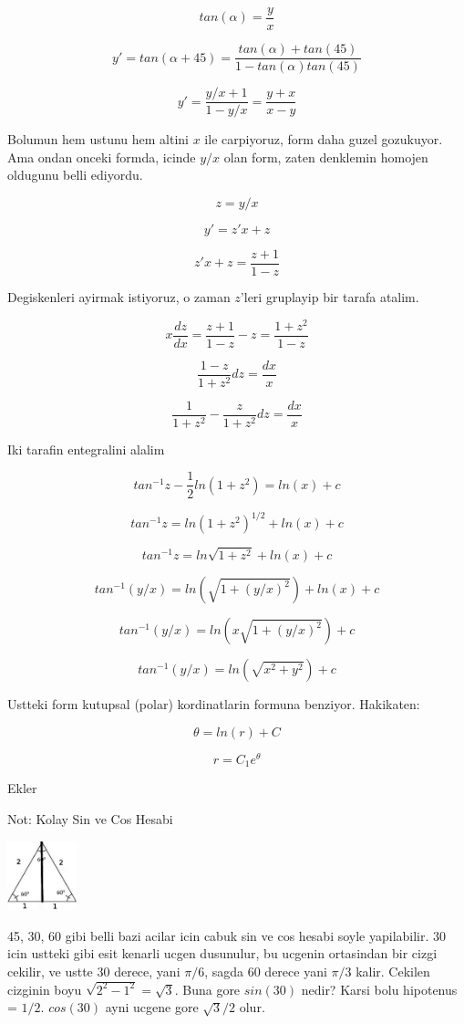 \documentclass[12pt,fleqn]{article}\usepackage{../common}
\begin{document}
\[ tan (\alpha) = \frac{y}{x} \]

\[ y' = tan(\alpha + 45) = \frac{tan(\alpha) + tan(45)}{1 - tan(\alpha)tan(45)} \]

\[ y' = \frac{y/x + 1}{1-y/x} =  \frac{y+x}{x-y} \]

Bolumun hem ustunu hem altini $x$ ile carpiyoruz, form daha guzel
gozukuyor. Ama ondan onceki formda, icinde $y/x$ olan form, zaten
denklemin homojen oldugunu belli ediyordu. 

\[ z = y/x \]

\[ y' = z'x + z \]

\[ z'x +z = \frac{z+1}{1-z} \]

Degiskenleri ayirmak istiyoruz, o zaman $z$'leri gruplayip bir tarafa
atalim. 

\[ x \frac{dz}{dx} = \frac{z+1}{1-z} - z = \frac{1+z^2}{1-z} \]

\[ \frac{1-z}{1+z^2}dz = \frac{dx}{x} \]

\[ \frac{1}{1+z^2} - \frac{z}{1+z^2} dz = \frac{dx}{x} \]


Iki tarafin entegralini alalim

\[ tan^{-1}z - \frac{1}{2} ln (1+z^2) = ln(x) + c \]

\[ tan^{-1}z = ln (1+z^2)^{1/2} + ln(x) + c \]

\[ tan^{-1}z = ln \sqrt{1+z^2} + ln(x) + c \]

\[ tan^{-1}(y/x) = ln (\sqrt{1+(y/x)^2}) + ln(x) + c \]

\[ tan^{-1}(y/x) = ln(x \sqrt{1+(y/x)^2}) + c \]

\[ tan^{-1}(y/x) = ln(\sqrt{x^2+y^2}) + c \]

Ustteki form kutupsal (polar) kordinatlarin formuna benziyor. Hakikaten:

\[ \theta = ln(r) + C \]

\[ r = C_1e^{\theta} \]

Ekler

Not: Kolay Sin ve Cos Hesabi

\includegraphics[height=2cm]{4_3.png}

45, 30, 60 gibi belli bazi acilar icin cabuk sin ve cos hesabi soyle
yapilabilir. 30 icin ustteki gibi esit kenarli ucgen dusunulur, bu ucgenin
ortasindan bir cizgi cekilir, ve ustte 30 derece, yani $\pi/6$, sagda 60
derece yani $\pi/3$ kalir. Cekilen cizginin boyu $\sqrt{2^2 - 1^2} =
\sqrt{3}$. Buna  gore $sin(30)$ nedir? Karsi bolu hipotenus = $1/2$. $cos(30)$ ayni ucgene 
gore $\sqrt{3}/2$ olur.
\end{document}
